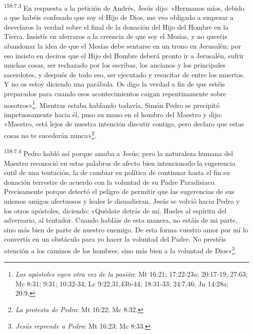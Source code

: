 {\par 
\textsuperscript{158:7.3} En respuesta a la petición de Andrés, Jesús dijo: «Hermanos míos, debido a que habéis confesado que soy el Hijo de Dios, me veo obligado a empezar a desvelaros la verdad sobre el final de la donación del Hijo del Hombre en la Tierra. Insistís en aferraros a la creencia de que soy el Mesías, y no queréis abandonar la idea de que el Mesías debe sentarse en un trono en Jerusalén; por eso insisto en deciros que el Hijo del Hombre deberá pronto ir a Jerusalén, sufrir muchas cosas, ser rechazado por los escribas, los ancianos y los principales sacerdotes, y después de todo eso, ser ejecutado y resucitar de entre los muertos. Y no os estoy diciendo una parábola. Os digo la verdad a fin de que estéis preparados para cuando esos acontecimientos caigan repentinamente sobre nosotros»\footnote{\textit{Los apóstoles oyen otra vez de la pasión}: Mt 16:21; 17:22-23a; 20:17-19; 27:63; Mc 8:31; 9:31; 10:32-34; Lc 9:22,31,43b-44; 18:31-33; 24:7,46; Jn 14:28a; 20:9.}. Mientras estaba hablando todavía, Simón Pedro se precipitó impetuosamente hacia él, puso su mano en el hombro del Maestro y dijo: «Maestro, está lejos de nuestra intención discutir contigo, pero declaro que estas cosas no te sucederán nunca»\footnote{\textit{La protesta de Pedro}: Mt 16:22; Mc 8:32.}.

\par 
\textsuperscript{158:7.4} Pedro habló así porque amaba a Jesús; pero la naturaleza humana del Maestro reconoció en estas palabras de afecto bien intencionado la sugerencia sutil de una tentación, la de cambiar su política de continuar hasta el fin su donación terrestre de acuerdo con la voluntad de su Padre Paradisiaco. Precisamente porque detectó el peligro de permitir que las sugerencias de sus mismos amigos afectuosos y leales le disuadieran, Jesús se volvió hacia Pedro y los otros apóstoles, diciendo: «Quédate detrás de mí. Hueles al espíritu del adversario, al tentador. Cuando habláis de esta manera, no estáis de mi parte, sino más bien de parte de nuestro enemigo. De esta forma vuestro amor por mí lo convertís en un obstáculo para yo hacer la voluntad del Padre. No prestéis atención a los caminos de los hombres, sino más bien a la voluntad de Dios»\footnote{\textit{Jesús reprende a Pedro}: Mt 16:23; Mc 8:33.}.

}
